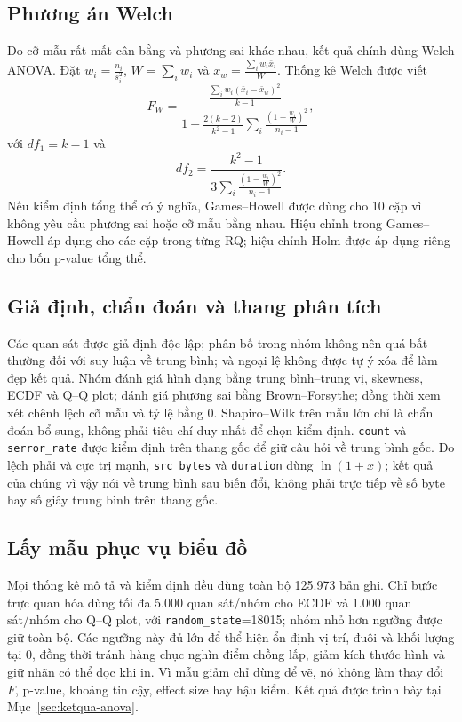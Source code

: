 \subsection{Phương án Welch}
Do cỡ mẫu rất mất cân bằng và phương sai khác nhau, kết quả chính dùng Welch ANOVA.
Đặt $w_i=\frac{n_i}{s_i^2}$, $W=\sum_iw_i$ và
$\bar x_w=\frac{\sum_iw_i\bar x_i}{W}$. Thống kê Welch được viết
\[
F_W=
\frac{
  \frac{\displaystyle\sum_iw_i(\bar x_i-\bar x_w)^2}{k-1}
}{
  \displaystyle 1+\frac{2(k-2)}{k^2-1}
  \sum_i\frac{\left(1-\frac{w_i}{W}\right)^2}{n_i-1}
},
\]
với $df_1=k-1$ và
\[
df_2=\frac{k^2-1}{
3\displaystyle\sum_i\frac{\left(1-\frac{w_i}{W}\right)^2}{n_i-1}
}.
\]
Nếu kiểm định tổng thể có ý nghĩa, Games--Howell được dùng cho 10 cặp vì không yêu cầu
phương sai hoặc cỡ mẫu bằng nhau. Hiệu chỉnh trong Games--Howell áp dụng cho các cặp
trong từng RQ; hiệu chỉnh Holm được áp dụng riêng cho bốn p-value tổng thể.

\subsection{Giả định, chẩn đoán và thang phân tích}
Các quan sát được giả định độc lập; phân bố trong nhóm không nên quá bất thường đối với
suy luận về trung bình; và ngoại lệ không được tự ý xóa để làm đẹp kết quả. Nhóm đánh
giá hình dạng bằng trung bình--trung vị, skewness, ECDF và Q--Q plot; đánh giá phương sai
bằng Brown--Forsythe; đồng thời xem xét chênh lệch cỡ mẫu và tỷ lệ bằng 0. Shapiro--Wilk
trên mẫu lớn chỉ là chẩn đoán bổ sung, không phải tiêu chí duy nhất để chọn kiểm định.
\texttt{count} và \texttt{serror\_rate} được kiểm định trên thang gốc để giữ câu hỏi
về trung bình gốc. Do lệch phải và cực trị mạnh, \texttt{src\_bytes} và
\texttt{duration} dùng $\ln(1+x)$; kết quả của chúng vì vậy nói về trung bình sau biến
đổi, không phải trực tiếp về số byte hay số giây trung bình trên thang gốc.

\subsection{Lấy mẫu phục vụ biểu đồ}
Mọi thống kê mô tả và kiểm định đều dùng toàn bộ 125.973 bản ghi. Chỉ bước trực quan hóa
dùng tối đa 5.000 quan sát/nhóm cho ECDF và 1.000 quan sát/nhóm cho Q--Q plot, với
\texttt{random\_state}=18015; nhóm nhỏ hơn ngưỡng được giữ toàn bộ. Các ngưỡng này đủ
lớn để thể hiện ổn định vị trí, đuôi và khối lượng tại 0, đồng thời tránh hàng chục nghìn
điểm chồng lấp, giảm kích thước hình và giữ nhãn có thể đọc khi in. Vì mẫu giảm chỉ dùng
để vẽ, nó không làm thay đổi $F$, p-value, khoảng tin cậy, effect size hay hậu kiểm.
Kết quả được trình bày tại Mục~\ref{sec:ketqua-anova}.

